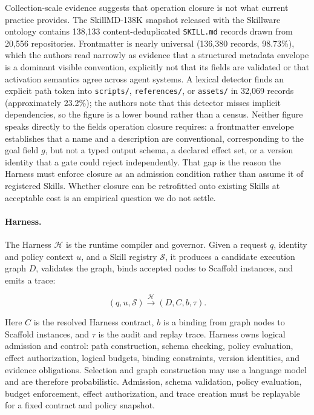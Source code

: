 \documentclass[11pt]{article}
\begin{document}
Collection-scale evidence suggests that operation closure is not what current practice provides. The SkillMD-138K snapshot released with the Skillware ontology \cite{fan2026skillware} contains 138,133 content-deduplicated \texttt{SKILL.md} records drawn from 20,556 repositories. Frontmatter is nearly universal (136,380 records, 98.73\%), which the authors read narrowly as evidence that a structured metadata envelope is a dominant visible convention, explicitly not that its fields are validated or that activation semantics agree across agent systems. A lexical detector finds an explicit path token into \texttt{scripts/}, \texttt{references/}, or \texttt{assets/} in 32,069 records (approximately 23.2\%); the authors note that this detector misses implicit dependencies, so the figure is a lower bound rather than a census. Neither figure speaks directly to the fields operation closure requires: a frontmatter envelope establishes that a name and a description are conventional, corresponding to the goal field $g$, but not a typed output schema, a declared effect set, or a version identity that a gate could reject independently. That gap is the reason the Harness must enforce closure as an admission condition rather than assume it of registered Skills. Whether closure can be retrofitted onto existing Skills at acceptable cost is an empirical question we do not settle.

\paragraph{Harness.}
The Harness $\mathcal{H}$ is the runtime compiler and governor. Given a request $q$, identity and policy context $u$, and a Skill registry $\mathcal{S}$, it produces a candidate execution graph $D$, validates the graph, binds accepted nodes to Scaffold instances, and emits a trace:

\begin{equation}
(q,u,\mathcal{S}) \xrightarrow{\mathcal{H}} (D,C,b,\tau).
\end{equation}

Here $C$ is the resolved Harness contract, $b$ is a binding from graph nodes to Scaffold instances, and $\tau$ is the audit and replay trace. Harness owns logical admission and control: path construction, schema checking, policy evaluation, effect authorization, logical budgets, binding constraints, version identities, and evidence obligations. Selection and graph construction may use a language model and are therefore probabilistic. Admission, schema validation, policy evaluation, budget enforcement, effect authorization, and trace creation must be replayable for a fixed contract and policy snapshot.
\end{document}
